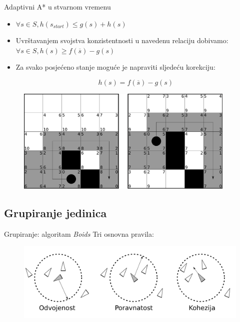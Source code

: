 \documentclass[utf8]{beamer}
\begin{document}
\begin{frame}{Adaptivni A* u stvarnom vremenu}
     {
        \begin{itemize}
            \item \(\forall s \in S, h(s_{start}) \leq g(s) + h(s)\)

            \item {
                Uvrštavanjem svojstva konzistentnosti u navedenu relaciju dobivamo:
                \(
                \forall s \in S, h(s) \geq f(\overline{s}) - g(s)
                \)
            }

            \item { 
                Za svako posjećeno stanje moguće je napraviti sljedeću korekciju:
                
                \[h(s) = f(\overline{s}) - g(s)\]
            }
        \end{itemize}
    }

     {
        \begin{figure}[h]
            \centering
            \includegraphics[height=5cm]{images/rtaastar.pdf}
        \end{figure}
    }
\end{frame}

\subsection{Grupiranje jedinica}

\begin{frame}{Grupiranje: algoritam \textit{Boids}}
    Tri osnovna pravila:
    \begin{figure}[h]
        \centering
        \includegraphics[width=1.0\linewidth]{images/boids.pdf}
    \end{figure}
\end{frame}
\end{document}
